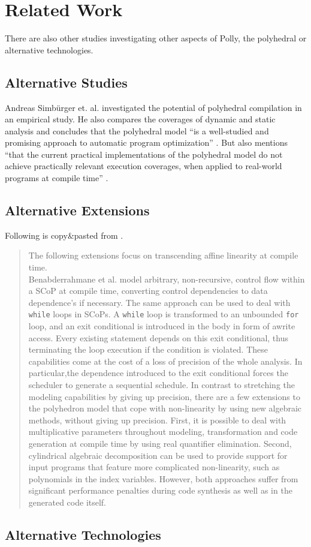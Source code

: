 \chapter{Related Work}
There are also other studies investigating other aspects of Polly, the polyhedral or alternative technologies. 

\section{Alternative Studies}
Andreas Simbürger et. al. \cite{PolyhedralEmpiricalStudy} investigated the potential of polyhedral compilation in an empirical study.
He also compares the coverages of dynamic and static analysis and concludes that the polyhedral model \enquote{is a well-studied and promising approach to automatic program optimization} \cite{PolyhedralEmpiricalStudy}.
But also mentions \enquote{that the current practical implementations of the polyhedral model do not achieve practically relevant execution coverages, when applied to real-world programs at compile time} \cite{PolyhedralEmpiricalStudy}.\\

\section{Alternative Extensions}
Following is copy\&pasted from \cite{PolyhedralEmpiricalStudy}.
\begin{quotation}
The following extensions focus on transcending affine linearity at compile time.\\
Benabderrahmane et al. model arbitrary, non-recursive, control flow within a SCoP at compile time, converting control dependencies to data dependence's if necessary.
The same approach can be used to deal with \texttt{while} loops in SCoPs.
A \texttt{while} loop is transformed to an unbounded \texttt{for} loop, and an exit conditional is introduced in the body in form of awrite access.
Every existing statement depends on this exit conditional, thus terminating the loop execution if the condition is violated.
These capabilities come at the cost of a loss of precision of the whole analysis.
In particular,the dependence introduced to the exit conditional forces the scheduler to generate a sequential schedule.
In contrast to stretching the modeling capabilities by giving up precision, there are a few extensions to the polyhedron model that cope with non-linearity by using new algebraic methods, without giving up precision.
First, it is possible to deal with multiplicative parameters throughout modeling, transformation and code generation at compile time by using real quantifier elimination.
Second, cylindrical algebraic decomposition can be used to provide support for input programs that feature more complicated non-linearity, such as polynomials in the index variables.
However, both approaches suffer from significant performance penalties during code synthesis as well as in the generated code itself.
\end{quotation}

\section{Alternative Technologies}
